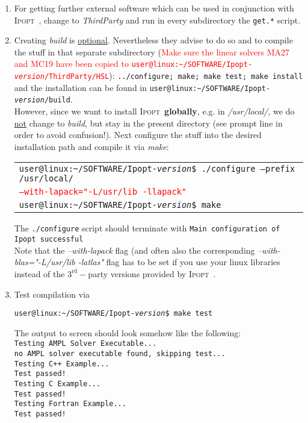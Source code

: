 \documentclass[a4paper,12pt]{article}
\makeatletter
\newcommand{\ipopt}{\textsc{Ipopt}\ }
\newcommand{\tbase}{\texttt{user@linux:\textasciitilde/}}
\newcommand{\dyeitred}{\textcolor{red}}{}
\makeatother
\begin{document}
\begin{enumerate}
\item For getting further external software which can be used in conjunction with \ipopt, change to \textit{ThirdParty} and run in every subdirectory the \texttt{get.*} script.
 \item Creating \textit{build} is \underline{optional}. Nevertheless they advise to do so
     and to compile the stuff in that separate subdirectory (\dyeitred{Make sure the linear solvers MA27 and MC19 have been copied to \texttt{\tbase SOFTWARE/Ipopt-\textit{version}/ThirdParty/HSL}}): \texttt{../configure; make; make test; make install} and the installation can be found in  \texttt{\tbase SOFTWARE/Ipopt-\textit{version}/build}.\\
However, since we want to install \ipopt \textbf{globally}, e.g. in
\textit{/usr/local/}, we do \underline{not} change to \textit{build}, but stay
in the present directory (see prompt line in order to avoid confusion!). Next
configure the stuff into the desired installation path and compile it via \textit{make}:
       \begin{center}
      \begin{tabular}{l}
      \texttt{\tbase SOFTWARE/Ipopt-\textit{version}\$ ./configure --prefix
         /usr/local/  } \\
      \hspace{7.5cm} \texttt{\dyeitred{--with-lapack="-L/usr/lib -llapack"}}\\
       \texttt{\tbase SOFTWARE/Ipopt-\textit{version}\$ make}
       \end{tabular}
       \end{center}
The \texttt{./configure} script should terminate with \texttt{Main configuration of Ipopt successful}\\
   Note that the \textit{--with-lapack} flag (and often also the corresponding \textit{--with-blas="-L/usr/lib -latlas"} flag has to be set if you use your linux libraries instead of the $3^{\textrm{rd}}-$party versions provided by \ipopt. 
\item Test  compilation via \begin{center}
  \texttt{\tbase SOFTWARE/Ipopt-\textit{version}\$ make test}\end{center} The
  output to screen should look somehow like the following:\\
  \texttt{Testing AMPL Solver Executable...\\
  no AMPL solver executable found, skipping test...\\ Testing C++ Example...\\Test passed! \\ Testing C Example...\\Test passed!\\Testing Fortran Example...
    \\ Test passed!} 


\end{enumerate}
\end{document}
